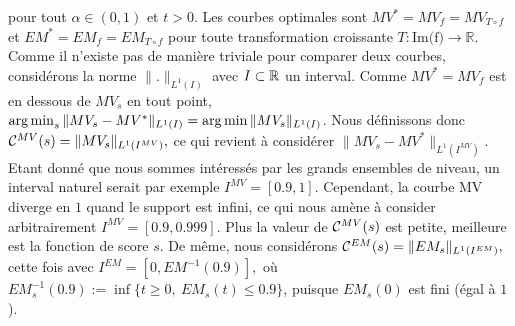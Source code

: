 pour tout $\alpha\in (0,1)$ et $t >0$.
%
Les courbes optimales sont $MV^* = MV_f = MV_{T \circ f}$ et $EM^* = EM_f = EM_{T \circ f}$ pour toute transformation croissante $T: \text{Im(f)} \to \mathbb{R}$.
%
Comme il n'existe pas de manière triviale pour comparer deux courbes, considérons la norme $\|.\|_{L^1(I)}$ avec $I\subset \mathbb{R}$ un interval. Comme $MV^*=MV_f$ est en dessous de $MV_s$ en tout point, $\argmin_s \| MV_s - MV^* \|_{L^1(I)} = \argmin \| MV_s \|_{L^1(I)} $. Nous définissons donc
$\mathcal{C}^{MV}(s) = \| MV_s \|_{L^1(I^{MV})},$ ce qui revient à considérer $\| MV_s - MV^* \|_{L^1(I^{MV})}$. %
Etant donné que nous sommes intéressés par les grands ensembles de niveau, un interval naturel serait par exemple $I^{MV} = [0.9, 1]$. Cependant, la courbe MV diverge en $1$ quand le support est infini, ce qui nous amène à consider arbitrairement $I^{MV} = [0.9, 0.999].$
Plus la valeur de $\mathcal{C}^{MV}(s)$ est petite, meilleure est la fonction de score $s$.
%
De même, nous considérons $\mathcal{C}^{EM}(s) = \|EM_s\|_{L^1(I^{EM})},$ cette fois avec $I^{EM} = [0,EM^{-1}(0.9)],$ où $EM_s^{-1}(0.9) := \inf\{t\ge 0,~ EM_s(t) \le 0.9\}$, puisque $EM_s(0)$ est fini (égal à $1$). 


